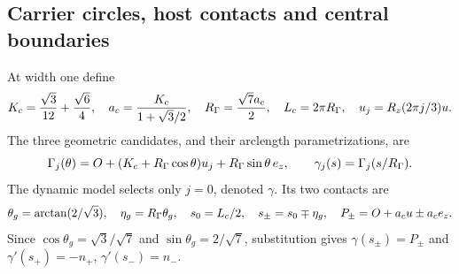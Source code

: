 \subsection{Carrier circles, host contacts and central boundaries}\label{sec:geometry}
At width one define
\begin{equation}\label{eq:circleconstants}
 K_c=\frac{\sqrt3}{12}+\frac{\sqrt6}{4},\quad
 a_c=\frac{K_c}{1+\sqrt3/2},\quad
 R_\Gamma=\frac{\sqrt7a_c}{2},\quad L_c=2\pi R_\Gamma,\quad
 u_j=R_z(2\pi j/3)u.
\end{equation}
The three geometric candidates, and their arclength parametrizations, are
\begin{equation}\label{eq:circle}
 \Gamma_j(\theta)=O+(K_c+R_\Gamma\cos\theta)u_j+R_\Gamma\sin\theta\,e_z,
 \qquad \gamma_j(s)=\Gamma_j(s/R_\Gamma).
\end{equation}
The dynamic model selects only $j=0$, denoted $\gamma$. Its two contacts are
\begin{equation}\label{eq:contacts}
 \theta_g=\arctan(2/\sqrt3),\quad \eta_g=R_\Gamma\theta_g,\quad
 s_0=L_c/2,\quad s_\pm=s_0\mp\eta_g,\quad
 P_\pm=O+a_cu\pm a_ce_z.
\end{equation}
Since $\cos\theta_g=\sqrt3/\sqrt7$ and $\sin\theta_g=2/\sqrt7$, substitution gives $\gamma(s_\pm)=P_\pm$ and $\gamma'(s_+)=-n_+$, $\gamma'(s_-)=n_-$.

